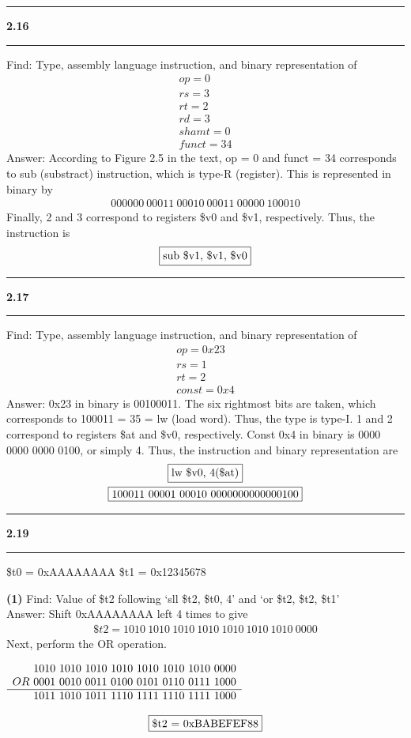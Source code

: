 \documentclass[11pt]{article}
\newcommand\question[2]{\vspace{.25in}\hrule\textbf{#1 #2}\vspace{.5em}\hrule\vspace{.10in}}
\renewcommand\part[1]{\vspace{.10in}\textbf{(#1)}}
\newenvironment{centermath}
 {\begin{center}$\displaystyle}
 {$\end{center}}
\begin{document}
\question{2.16}{}
Find: Type, assembly language instruction, and binary representation of 
\begin{gather*}
op = 0 \\
rs = 3 \\
rt = 2 \\ 
rd = 3 \\
shamt = 0 \\
funct = 34
\end{gather*}
Answer: According to Figure 2.5 in the text, op = 0 and funct = 34 corresponds to sub (substract) instruction, which is type-R (register). This is represented in binary by
\begin{gather*}
000000 \ 00011 \ 00010 \ 00011 \ 00000 \ 100010
\end{gather*}
Finally, 2 and 3 correspond to registers \$v0 and \$v1, respectively. Thus, the instruction is
\begin{gather*}
\fbox{sub \$v1, \$v1, \$v0}
\end{gather*}

\question{2.17}{} 
Find: Type, assembly language instruction, and binary representation of 
\begin{gather*}
op = 0x23 \\
rs = 1 \\
rt = 2 \\ 
const = 0x4
\end{gather*}
Answer: 0x23 in binary is 00100011. The six rightmost bits are taken, which corresponds to 100011 = 35 = lw (load word). Thus, the type is type-I. 1 and 2 correspond to registers \$at and \$v0, respectively. Const 0x4 in binary is 0000 0000 0000 0100, or simply 4. Thus, the instruction and binary representation are
\begin{gather*}
\fbox{lw \$v0, 4(\$at)} \\
\fbox{100011 00001 00010 0000000000000100}
\end{gather*}

\question{2.19}{}
\$t0 = 0xAAAAAAAA \quad \$t1 = 0x12345678

\part{1}
Find: Value of \$t2 following `sll \$t2, \$t0, 4' and `or \$t2, \$t2, \$t1' \\
\vspace{5mm}
Answer: Shift 0xAAAAAAAA left 4 times to give
\begin{gather*}
\$t2 = 1010 \ 1010 \ 1010 \ 1010 \ 1010 \ 1010 \ 1010 \ 0000
\end{gather*}
Next, perform the OR operation.
\begin{centermath}
\begin{array}[t]{r}
    1010 \ 1010 \ 1010 \ 1010 \ 1010 \ 1010 \ 1010 \ 0000 \\
OR \ 0001\ 0010\ 0011\ 0100\ 0101\ 0110\ 0111\ 1000 \\ \hline
   \ 1011\ 1010\ 1011\ 1110\ 1111\ 1110\ 1111\ 1000
\end{array} 
\end{centermath}
\begin{gather*}
\fbox{\$t2 = 0xBABEFEF88}
\end{gather*}
\end{document}
